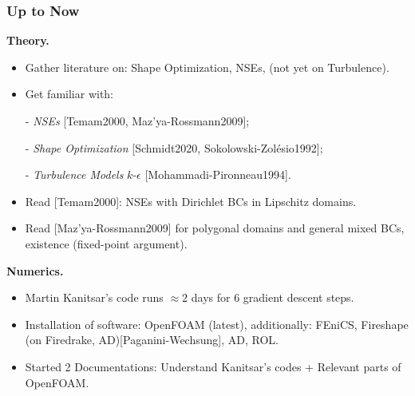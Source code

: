 \documentclass[t,xcolor=table,english]{beamer}   %
\begin{document}
\begin{frame}
	\frametitle{Up to Now}
	\textbf{Theory.}
	\begin{itemize}
		\item Gather literature on: Shape Optimization, NSEs, (not yet on Turbulence).
		\item Get familiar with:
		
		- \textit{NSEs} [Temam2000, Maz'ya-Rossmann2009];
		
		- \textit{Shape Optimization} [Schmidt2020, Sokolowski-Zol\'esio1992];
		
		- \textit{Turbulence Models} $k$-$\epsilon$ [Mohammadi-Pironneau1994].
		\item Read [Temam2000]: NSEs with Dirichlet BCs in Lipschitz domains.
		\item Read [Maz'ya-Rossmann2009] for polygonal domains and {\color{red} general mixed BCs}, existence (fixed-point argument).
	\end{itemize}
	\textbf{Numerics.}
	\begin{itemize}
		\item Martin Kanitsar's code runs $\approx 2$ days for 6 gradient descent steps.
		\item Installation of software: {\color{red} OpenFOAM} (latest), additionally: FEniCS, Fireshape (on Firedrake, AD)[Paganini-Wechsung], AD, ROL.
		\item Started 2 Documentations: Understand Kanitsar's codes + Relevant parts of OpenFOAM.
	\end{itemize}
\end{frame}
\end{document}

